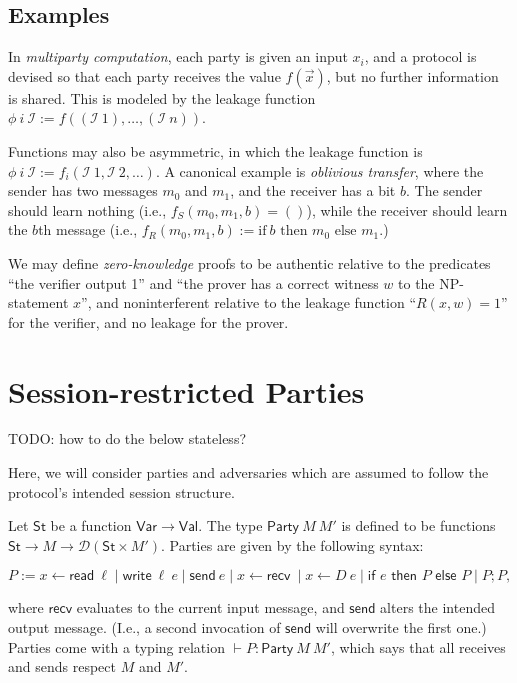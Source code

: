 \documentclass{article}
\newcommand{\Val}{\mathsf{Val}}
\newcommand{\St}{\mathsf{St}}
\newcommand{\Var}{\mathsf{Var}}
\newcommand{\D}{\mathcal{D}}
\newcommand{\Read}{\mathsf{read}}
\newcommand{\Write}{\mathsf{write}}
\newcommand{\send}{\mathsf{send}}
\newcommand{\recv}{\mathsf{recv}}
\newcommand{\I}{\mathcal{I}}
\begin{document}
\subsection{Examples}


In \emph{multiparty computation}, each party is given an input $x_i$, and a protocol is devised so that each party receives the value $f(\vec{x})$, but no further information is shared. This is modeled by the leakage function $\phi\ i\ \I := f((\I\ 1), \dots, (\I\ n))$.

Functions may also be asymmetric, in which the leakage function is $\phi\ i\ \I := f_i(\I\ 1, \I\ 2, \dots)$. A canonical example is \emph{oblivious transfer}, where the sender has two messages $m_0$ and $m_1$, and the receiver has a bit $b$. The sender should learn nothing (i.e., $f_S (m_0, m_1, b) = ()$), while the receiver should learn the $b$th message (i.e., $f_R (m_0, m_1, b) := \text{if}\ b \text{ then } m_0 \text{ else } m_1.$)


We may define \emph{zero-knowledge} proofs to be authentic relative to the predicates ``the verifier output 1'' and ``the prover has a correct witness $w$ to the NP-statement $x$'', and noninterferent relative to the leakage function ``$R(x,w) = 1$'' for the verifier, and no leakage for the prover. 


\section{Session-restricted Parties}

TODO: how to do the below stateless?


Here, we will consider parties and adversaries which are assumed to follow the protocol's intended session structure. 

Let $\St$ be a function $\Var \to \Val$. The type $\mathsf{Party}\ M\ M'$ is defined to be functions $\St \to M \to \D(\St \times M')$. Parties are given by the following syntax:

\[ P := x \leftarrow \Read\ \ell \mid \Write\ \ell\ e \mid \send\ e \mid x \leftarrow \recv\ \mid x \leftarrow D\ e \mid \textsf{if } e \textsf{ then } P \textsf{ else } P \mid P; P, \]

where $\recv$ evaluates to the current input message, and $\send$ alters the intended output message. (I.e., a second invocation of $\send$ will overwrite the first one.) Parties come with a typing relation $\vdash P : \mathsf{Party}\ M\ M'$, which says that all receives and sends respect $M$ and $M'$.
\end{document}
